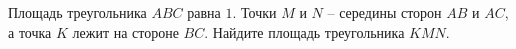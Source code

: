 \begin{ex}
	\begin{condition}
		Площадь треугольника \( ABC  \) равна \( 1 \). Точки \( M  \) и \( N \) – середины сторон \( AB  \) и \( AC \), а точка \( K  \) лежит на стороне \( BC \).	Найдите площадь треугольника \( KMN \).
	\end{condition}
\end{ex}